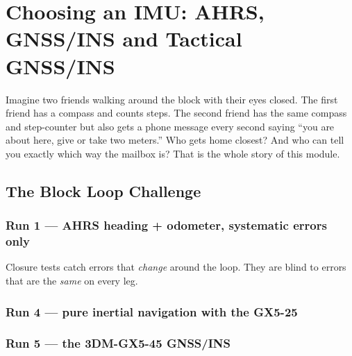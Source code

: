 \chapter{Choosing an IMU: AHRS, GNSS/INS and Tactical GNSS/INS}

\begin{kid}
Imagine two friends walking around the block with their eyes closed. The first friend has a compass and counts steps. The second friend has the same compass and step-counter but also gets a phone message every second saying ``you are about here, give or take two meters.'' Who gets home closest? And who can tell you exactly which way the mailbox is? That is the whole story of this module.
\end{kid}

\section{The Block Loop Challenge}

\subsection*{Run 1 --- AHRS heading + odometer, systematic errors only}


\begin{bigidea}
Closure tests catch errors that \emph{change} around the loop. They are blind to errors that are the \emph{same} on every leg.
\end{bigidea}

\subsection*{Run 4 --- pure inertial navigation with the GX5-25}


\subsection*{Run 5 --- the 3DM-GX5-45 GNSS/INS}


